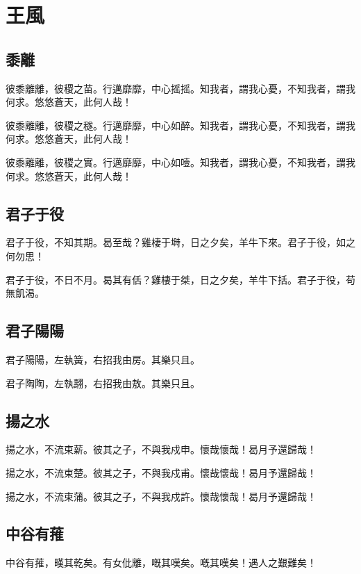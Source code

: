 \section[王風]{王風}

\subsection[黍離]{黍離}

彼黍離離，彼稷之苗。行邁靡靡，中心摇摇。知我者，謂我心憂，不知我者，謂我何求。悠悠蒼天，此何人哉！

彼黍離離，彼稷之穟。行邁靡靡，中心如醉。知我者，謂我心憂，不知我者，謂我何求。悠悠蒼天，此何人哉！

彼黍離離，彼稷之實。行邁靡靡，中心如噎。知我者，謂我心憂，不知我者，謂我何求。悠悠蒼天，此何人哉！

\subsection[君子于役]{君子于役}

君子于役，不知其期。曷至哉？雞棲于塒，日之夕矣，羊牛下來。君子于役，如之何勿思！

君子于役，不日不月。曷其有佸？雞棲于桀，日之夕矣，羊牛下括。君子于役，苟無飢渴。

\subsection[君子陽陽]{君子陽陽}

君子陽陽，左執簧，右招我由房。其樂只且。

君子陶陶，左執翿，右招我由敖。其樂只且。

\subsection[揚之水]{揚之水}

揚之水，不流束薪。彼其之子，不與我戍申。懷哉懷哉！曷月予還歸哉！

揚之水，不流束楚。彼其之子，不與我戍甫。懷哉懷哉！曷月予還歸哉！

揚之水，不流束蒲。彼其之子，不與我戍許。懷哉懷哉！曷月予還歸哉！

\subsection[中谷有蓷]{中谷有蓷}

中谷有蓷，暵其乾矣。有女仳離，嘅其嘆矣。嘅其嘆矣！遇人之艱難矣！

